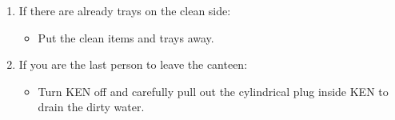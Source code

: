 \documentclass{article}
\begin{document}
\begin{enumerate}
\bfseries \item If there are already trays on the clean side: \normalfont

\begin{itemize}

\item Put the clean items and trays away.

\end{itemize}

\bfseries \item If you are the last person to leave the canteen: \normalfont

\begin{itemize}

\item Turn KEN off and carefully pull out the cylindrical plug inside KEN to
drain the dirty water.

\end{itemize}

\end{enumerate}

\underskriv
\end{document}
